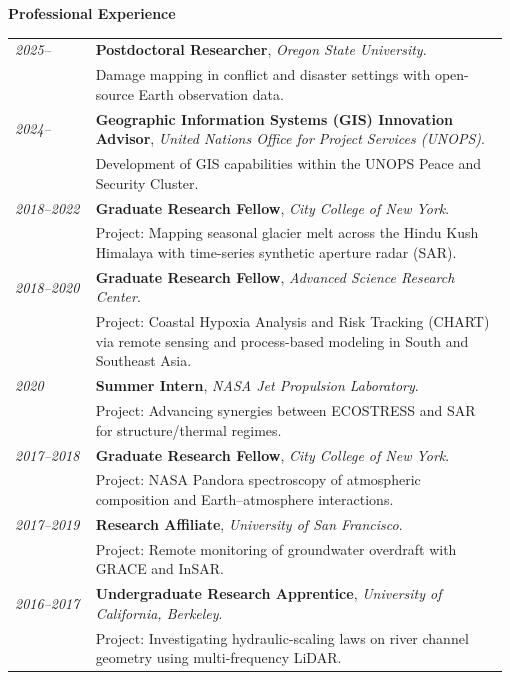 \documentclass[letterpaper,11pt,oneside]{article}
\newcommand{\datefmt}[1]{\textit{#1}}
\begin{document}
\begin{flushleft}\textbf{\Large{Professional Experience}}\end{flushleft}
\vspace{-4ex}
\begin{longtable}{@{}p{0.16\linewidth}p{0.82\linewidth}@{}}

\datefmt{2025–} & \textbf{Postdoctoral Researcher}, \textit{Oregon State University}.\\
& Damage mapping in conflict and disaster settings with open-source Earth observation data.\\[1.0ex]

\datefmt{2024–} & \textbf{Geographic Information Systems (GIS) Innovation Advisor}, \textit{United Nations Office for Project Services (UNOPS)}.\\
& Development of GIS capabilities within the UNOPS Peace and Security Cluster.\\[1.0ex]

\datefmt{2018–2022} & \textbf{Graduate Research Fellow}, \textit{City College of New York}.\\
& Project: Mapping seasonal glacier melt across the Hindu Kush Himalaya with time-series synthetic aperture radar (SAR).\\[1.0ex]

\datefmt{2018–2020} & \textbf{Graduate Research Fellow}, \textit{Advanced Science Research Center}.\\
& Project: Coastal Hypoxia Analysis and Risk Tracking (CHART) via remote sensing and process-based modeling in South and Southeast Asia.\\[1.0ex]

\datefmt{2020} & \textbf{Summer Intern}, \textit{NASA Jet Propulsion Laboratory}.\\
& Project: Advancing synergies between ECOSTRESS and SAR for structure/thermal regimes.\\[1.0ex]

\datefmt{2017–2018} & \textbf{Graduate Research Fellow}, \textit{City College of New York}.\\
& Project: NASA Pandora spectroscopy of atmospheric composition and Earth–atmosphere interactions.\\[1.0ex]

\datefmt{2017–2019} & \textbf{Research Affiliate}, \textit{University of San Francisco}.\\
& Project: Remote monitoring of groundwater overdraft with GRACE and InSAR.\\[1.0ex]

\datefmt{2016–2017} & \textbf{Undergraduate Research Apprentice}, \textit{University of California, Berkeley}.\\
& Project: Investigating hydraulic-scaling laws on river channel geometry using multi-frequency LiDAR.\\[1.0ex]

\end{longtable}
\vspace{-4ex}
\end{document}
